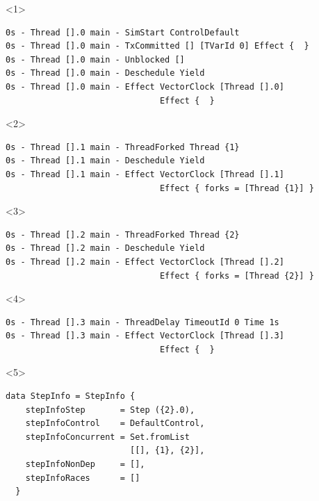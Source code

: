 \documentclass[t,x11names,xcolor={x11names},hyperref={colorlinks,citecolor=Blue4,linkcolor=Blue4,anchorcolor=Blue4,urlcolor=Blue4}]{beamer}
\begin{document}
\begin{frame}[fragile]
\begin{columns}
    \begin{column}{0.6\textwidth}
      \begin{onlyenv}<1>
        \tiny
        \begin{verbatim}
0s - Thread [].0 main - SimStart ControlDefault
0s - Thread [].0 main - TxCommitted [] [TVarId 0] Effect {  }
0s - Thread [].0 main - Unblocked []
0s - Thread [].0 main - Deschedule Yield
0s - Thread [].0 main - Effect VectorClock [Thread [].0]
                               Effect {  }
        \end{verbatim}
      \end{onlyenv}
      \begin{onlyenv}<2>
        \tiny
        \begin{verbatim}
0s - Thread [].1 main - ThreadForked Thread {1}
0s - Thread [].1 main - Deschedule Yield
0s - Thread [].1 main - Effect VectorClock [Thread [].1]
                               Effect { forks = [Thread {1}] }
        \end{verbatim}
      \end{onlyenv}
      \begin{onlyenv}<3>
        \tiny
        \begin{verbatim}
0s - Thread [].2 main - ThreadForked Thread {2}
0s - Thread [].2 main - Deschedule Yield
0s - Thread [].2 main - Effect VectorClock [Thread [].2]
                               Effect { forks = [Thread {2}] }
        \end{verbatim}
      \end{onlyenv}
      \begin{onlyenv}<4>
        \tiny
        \begin{verbatim}
0s - Thread [].3 main - ThreadDelay TimeoutId 0 Time 1s
0s - Thread [].3 main - Effect VectorClock [Thread [].3]
                               Effect {  }
        \end{verbatim}
      \end{onlyenv}
      \begin{onlyenv}<5>
        \tiny
        \begin{verbatim}
data StepInfo = StepInfo {
    stepInfoStep       = Step ({2}.0),
    stepInfoControl    = DefaultControl,
    stepInfoConcurrent = Set.fromList
                         [[], {1}, {2}],
    stepInfoNonDep     = [],
    stepInfoRaces      = []
  }


\end{verbatim}
\end{onlyenv}
\end{column}
\end{columns}
\end{frame}
\end{document}
